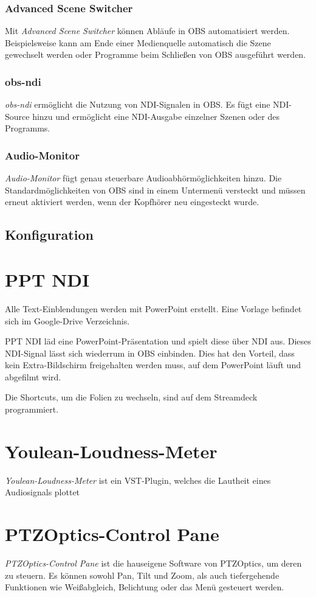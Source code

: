 			\subsubsection{Advanced Scene Switcher}
				Mit \textit{Advanced Scene Switcher} können Abläufe in \Gls{OBS} automatisiert werden.
				Beispielsweise kann am Ende einer Medienquelle automatisch die Szene gewechselt werden oder Programme beim Schließen von \Gls{OBS} ausgeführt werden.
			\subsubsection{obs-ndi}\label{sssec:ndi}
				\textit{obs-ndi} ermöglicht die Nutzung von \Gls{NDI}-Signalen in \Gls{OBS}.
				Es fügt eine \Gls{NDI}-Source hinzu und ermöglicht eine \Gls{NDI}-Ausgabe einzelner Szenen oder des Programms.
			\subsubsection{Audio-Monitor}
				\textit{Audio-Monitor} fügt genau steuerbare Audioabhörmöglichkeiten hinzu.
				Die Standardmöglichkeiten von OBS sind in einem Untermenü versteckt und müssen erneut aktiviert werden, wenn der Kopfhörer neu eingesteckt wurde.

		\subsection{Konfiguration}
			
	\section{PPT NDI}
		Alle Text-Einblendungen werden mit PowerPoint erstellt.
		Eine Vorlage befindet sich im Google-Drive Verzeichnis.

		PPT NDI läd eine PowerPoint-Präsentation und spielt diese über \Gls{NDI} aus.
		Dieses \Gls{NDI}-Signal lässt sich wiederrum in \Gls{OBS} einbinden.
		Dies hat den Vorteil, dass kein Extra-Bildschirm freigehalten werden muss, auf dem PowerPoint läuft und abgefilmt wird.

		Die Shortcuts, um die Folien zu wechseln, sind auf dem Streamdeck programmiert.
	\section{Youlean-Loudness-Meter}
		\textit{Youlean-Loudness-Meter} ist ein \Gls{VST-Plugin}, welches die \Gls{Lautheit} eines Audiosignals plottet
	\section{PTZOptics-Control Pane}
		\textit{PTZOptics-Control Pane} ist die hauseigene Software von PTZOptics, um deren  zu steuern.
		Es können sowohl Pan, Tilt und Zoom, als auch tiefergehende Funktionen wie Weißabgleich, Belichtung oder das Menü gesteuert werden.